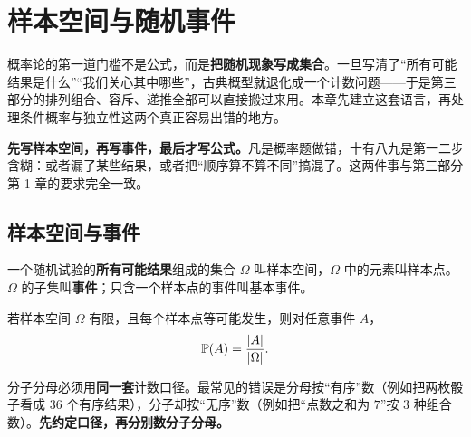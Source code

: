 
\chapter{样本空间与随机事件}
\begin{chapterintro}[章节导读]
概率论的第一道门槛不是公式，而是\textbf{把随机现象写成集合}。一旦写清了“所有可能结果是什么”“我们关心其中哪些”，古典概型就退化成一个计数问题——于是第三部分的排列组合、容斥、递推全部可以直接搬过来用。本章先建立这套语言，再处理条件概率与独立性这两个真正容易出错的地方。
\end{chapterintro}

\begin{tip}[概率论的统一口诀]
\textbf{先写样本空间，再写事件，最后才写公式。}凡是概率题做错，十有八九是第一二步含糊：或者漏了某些结果，或者把“顺序算不算不同”搞混了。这两件事与第三部分第 1 章的要求完全一致。
\end{tip}

\section{样本空间与事件}
\begin{definition}[样本空间]
一个随机试验的\textbf{所有可能结果}组成的集合 $\Omega$ 叫样本空间，$\Omega$ 中的元素叫样本点。$\Omega$ 的子集叫\textbf{事件}；只含一个样本点的事件叫基本事件。
\end{definition}

\begin{definition}[古典概型]
若样本空间 $\Omega$ 有限，且每个样本点等可能发生，则对任意事件 $A$，
\[
\mathbb P(A)=\frac{|A|}{|\Omega|}.
\]
\end{definition}

\begin{teach}
分子分母必须用\textbf{同一套}计数口径。最常见的错误是分母按“有序”数（例如把两枚骰子看成 $36$ 个有序结果），分子却按“无序”数（例如把“点数之和为 $7$”按 $3$ 种组合数）。\textbf{先约定口径，再分别数分子分母。}
\end{teach}

